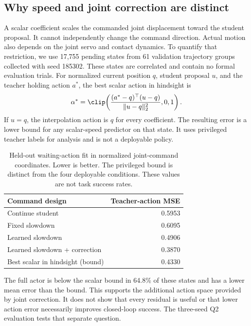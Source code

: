 \subsection{Why speed and joint correction are distinct}
A scalar coefficient scales the commanded joint displacement toward the student proposal. It cannot independently change the command direction. Actual motion also depends on the joint servo and contact dynamics. To quantify that restriction, we use 17,755 pending states from 61 validation trajectory groups collected with seed 185302. These states are correlated and contain no formal evaluation trials. For normalized current position $q$, student proposal $u$, and the teacher holding action $a^*$, the best scalar action in hindsight is
\begin{equation}
 \alpha^*=\clip\!\left(\frac{(a^*-q)^\top(u-q)}{\|u-q\|_2^2},0,1\right).
\end{equation}
If $u=q$, the interpolation action is $q$ for every coefficient. The resulting error is a lower bound for any scalar-speed predictor on that state. It uses privileged teacher labels for analysis and is not a deployable policy.

\begin{table}[h]
\centering\small
\begin{tabular}{lr}
\toprule
Command design & Teacher-action MSE\\
\midrule
Continue student & 0.5953\\
Fixed slowdown & 0.6095\\
Learned slowdown & 0.4906\\
Learned slowdown + correction & 0.3870\\
\midrule
Best scalar in hindsight (bound) & 0.4330\\
\bottomrule
\end{tabular}
\caption{Held-out waiting-action fit in normalized joint-command coordinates. Lower is better. The privileged bound is distinct from the four deployable conditions. These values are not task success rates.}
\label{tab:action_space}
\end{table}
The full actor is below the scalar bound in 64.8\% of these states and has a lower mean error than the bound. This supports the additional action space provided by joint correction. It does not show that every residual is useful or that lower action error necessarily improves closed-loop success. The three-seed Q2 evaluation tests that separate question.





